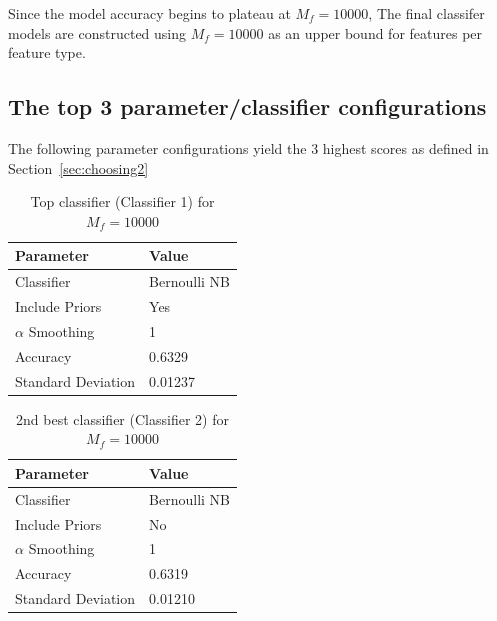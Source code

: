 \documentclass[11pt]{article}
\begin{document}
Since the model accuracy begins to plateau at $M_f = 10000$,
The final classifer models are constructed using $M_f = 10000$ as an upper bound for features per feature type.

\subsection{The top 3 parameter/classifier configurations}\label{sec:top3}

The following parameter configurations yield the 3 highest scores as defined in Section~\ref{sec:choosing2}

\begin{table}[!h]
	\begin{center}
		\begin{tabular}{|l|l|}			
			\hline
			Parameter & Value \\
			\hline\hline
			Classifier & Bernoulli NB \\
			Include Priors & Yes \\
			$\alpha$ Smoothing & 1 \\
			\hline\hline
			Accuracy &  0.6329\\
			Standard Deviation &   0.01237 \\
			\hline
		\end{tabular}
		\caption{Top classifier (Classifier 1) for $M_f = 10000$}
		\label{tbl:1st10000}
	\end{center}
\end{table}

\begin{table}[!h]
	\begin{center}
		\begin{tabular}{|l|l|}			
			\hline
			Parameter & Value \\
			\hline\hline
			Classifier & Bernoulli NB \\
			Include Priors & No \\
			$\alpha$ Smoothing & 1 \\
			\hline\hline
			Accuracy &  0.6319\\
			Standard Deviation &   0.01210 \\
			\hline
		\end{tabular}
		\caption{2nd best classifier (Classifier 2) for $M_f = 10000$}
		\label{tbl:2nd10000}
	\end{center}
\end{table}
\end{document}
